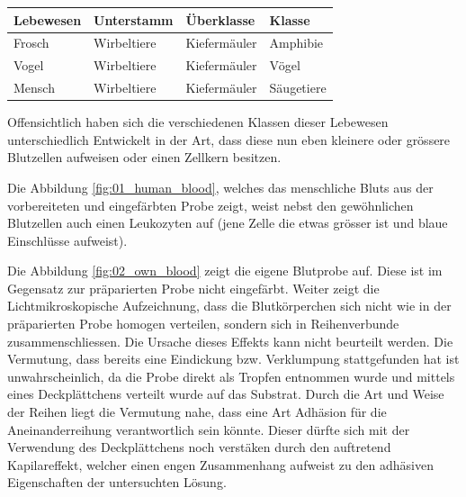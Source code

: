 \begin{table}[h!]
	\centering
	\begin{tabular}{l l l l}
		Lebewesen	& Unterstamm	& Überklasse 	& Klasse \\
		\hline
		Frosch		& Wirbeltiere	& Kiefermäuler	& Amphibie \\
		Vogel		& Wirbeltiere	& Kiefermäuler	& Vögel \\
		Mensch		& Wirbeltiere	& Kiefermäuler	& Säugetiere \\
	\end{tabular}
\end{table}

Offensichtlich haben sich die verschiedenen Klassen dieser Lebewesen
unterschiedlich Entwickelt in der Art, dass diese nun eben kleinere oder
grössere Blutzellen aufweisen oder einen Zellkern besitzen.

Die Abbildung \ref{fig:01_human_blood}, welches das menschliche Bluts aus der
vorbereiteten und eingefärbten Probe zeigt, weist nebst den gewöhnlichen
Blutzellen auch einen Leukozyten auf (jene Zelle die etwas grösser ist und
blaue Einschlüsse aufweist).

Die Abbildung \ref{fig:02_own_blood} zeigt die eigene Blutprobe auf. Diese
ist im Gegensatz zur präparierten Probe nicht eingefärbt. Weiter zeigt die
Lichtmikroskopische Aufzeichnung, dass die Blutkörperchen sich nicht wie
in der präparierten Probe homogen verteilen, sondern sich in Reihenverbunde
zusammenschliessen. Die Ursache dieses Effekts kann nicht beurteilt werden.
Die Vermutung, dass bereits eine Eindickung bzw. Verklumpung stattgefunden
hat ist unwahrscheinlich, da die Probe direkt als Tropfen entnommen wurde
und mittels eines Deckplättchens verteilt wurde auf das Substrat. Durch die
Art und Weise der Reihen liegt die Vermutung nahe, dass eine Art Adhäsion
für die Aneinanderreihung verantwortlich sein könnte. Dieser dürfte sich
mit der Verwendung des Deckplättchens noch verstäken durch den auftretend
Kapilareffekt, welcher einen engen Zusammenhang aufweist zu den adhäsiven
Eigenschaften der untersuchten Lösung.
